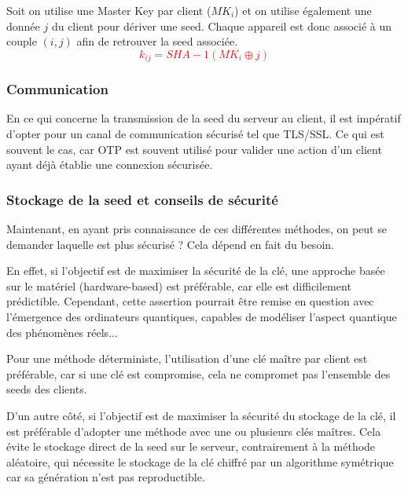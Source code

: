 \documentclass[a4paper, 10pt]{article}
\newcommand{\otp}{\textsc{OTP} }
\begin{document}
Soit on utilise \textcolor{myblue}{une Master Key par client} \textcolor{mygreen}{($MK_i$)} et on utilise également une donnée \textcolor{mygreen}{$j$} du client pour \textcolor{myblue}{dériver une seed}.
Chaque appareil est donc associé à un couple \textcolor{mygreen}{$(i,j)$} afin de retrouver la seed associée.
\textcolor{red}{$$
k_{ij} = SHA-1(MK_i \oplus j)
$$}

            \subsubsection{Communication}

En ce qui concerne la \textcolor{myblue}{transmission de la seed} du serveur au client, il est impératif d'opter pour un \textcolor{myblue}{canal de communication sécurisé} tel que \textcolor{mygreen}{TLS}/\textcolor{mygreen}{SSL}. 
Ce qui est souvent le cas, car \otp est souvent utilisé pour valider une action d'un client ayant déjà établie une connexion sécurisée.


            \subsubsection{Stockage de la seed et conseils de sécurité}

Maintenant, en ayant pris connaissance de ces différentes méthodes, on peut se demander laquelle est plus sécurisé ? Cela dépend en fait du besoin.

En effet, si l'objectif est de \textcolor{myblue}{maximiser la sécurité de la clé}, une approche basée sur le matériel (\textcolor{mygreen}{hardware-based}) est préférable, car elle est \textcolor{myblue}{difficilement prédictible}. Cependant, cette assertion pourrait être remise en question avec l'émergence des ordinateurs quantiques, capables de modéliser l'aspect quantique des phénomènes réels... 

Pour une \textcolor{myblue}{méthode déterministe}, l'utilisation d'\textcolor{mygreen}{une clé maître par client est préférable}, car si une clé est compromise, cela ne compromet pas l'ensemble des seeds des clients.

D'un autre côté, si l'objectif est de \textcolor{myblue}{maximiser la sécurité du stockage} de la clé, il est préférable d'adopter une \textcolor{myblue}{méthode avec une ou plusieurs clés maîtres}. Cela \textcolor{mygreen}{évite le stockage direct de la seed} sur le serveur, contrairement à la méthode aléatoire, qui nécessite le stockage de la clé chiffré par un algorithme symétrique car sa génération n'est pas reproductible.
\end{document}
